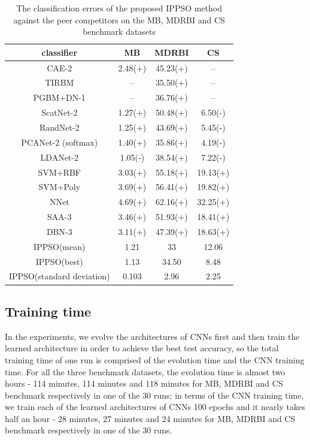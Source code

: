 \documentclass[conference]{IEEEtran}
\begin{document}
\begin{table}[!t]
	\renewcommand{\arraystretch}{1.3}
	\caption{The classification errors of the proposed IPPSO method against the peer competitors on the MB, MDRBI and CS benchmark datasets}
	\label{table:ResultComparison}
	\centering
	\begin{tabular}{|c|c|c|c|}
		\hline
		classiﬁer & MB & MDRBI & CS\\
		\hline
		CAE-2 & 2.48(+) & 45.23(+) & --\\
		\hline
		TIRBM & -- & 35.50(+) & --\\
		\hline
		PGBM+DN-1 & -- & 36.76(+) & --\\
		\hline
		ScatNet-2 & 1.27(+) & 50.48(+) & 6.50(-)\\
		\hline
		RandNet-2 & 1.25(+) & 43.69(+) & 5.45(-)\\
		\hline
		PCANet-2 (softmax)  & 1.40(+) & 35.86(+) & 4.19(-)\\
		\hline
		LDANet-2 & 1.05(-) & 38.54(+) & 7.22(-)\\
		\hline
		SVM+RBF & 3.03(+) & 55.18(+) & 19.13(+)\\
		\hline
		SVM+Poly & 3.69(+) & 56.41(+) & 19.82(+)\\
		\hline
		NNet & 4.69(+) & 62.16(+) & 32.25(+)\\
		\hline
		SAA-3 & 3.46(+) & 51.93(+) & 18.41(+)\\
		\hline
		DBN-3  & 3.11(+) & 47.39(+) & 18.63(+)\\
		\hline
		IPPSO(mean) & 1.21 & 33 & 12.06\\
		\hline
		IPPSO(best) & 1.13 & 34.50 & 8.48\\
		\hline
		IPPSO(standard deviation) & 0.103 & 2.96 & 2.25\\
		\hline
	\end{tabular}
\end{table}

\subsection{Training time}\label{sec:TrainingTime}

In the experiments, we evolve the architectures of CNNs first and then train the learned architecture in order to achieve the best test accuracy, so the total training time of one run is comprised of the evolution time and the CNN training time. For all the three benchmark datasets, the evolution time is almost two hours - 114 minutes, 114 minutes and 118 minutes for MB, MDRBI and CS benchmark respectively in one of the 30 runs; in terms of the CNN training time, we train each of the learned architectures of CNNs 100 epochs and it nearly takes half an hour - 28 minutes, 27 minutes and 24 minutes for MB, MDRBI and CS benchmark respectively in one of the 30 runs. 
\end{document}
